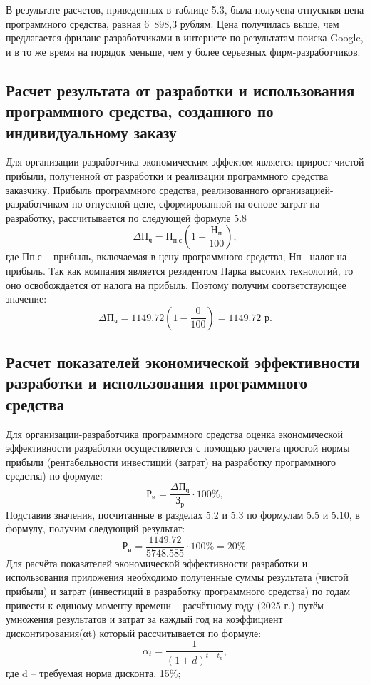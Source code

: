 В результате расчетов, приведенных в таблице 5.3, была получена отпускная цена программного средства, равная 6 898,3 рублям. Цена получилась выше, чем предлагается фриланс-разработчиками в интернете по результатам поиска Google, и в то же время на порядок меньше, чем у более серьезных фирм-разработчиков. 


\subsection{Расчет результата от разработки и использования программного средства, созданного по индивидуальному заказу} 


Для организации-разработчика экономическим эффектом является прирост чистой прибыли, полученной от разработки и реализации программного средства заказчику.
Прибыль программного средства, реализованного организацией-разработчиком по отпускной цене, сформированной на основе затрат на разработку, рассчитывается по следующей формуле 5.8
\begin{equation}
	\Delta 	\mathrm{П_{ч}} = \mathrm{П_{п.с}} \left( 1 - \frac{	\mathrm{Н_{п}}}{100} \right),
\end{equation}
где Пп.с – прибыль, включаемая в цену программного средства, Нп –налог на прибыль. Так как компания является резидентом Парка высоких технологий, то оно освобождается от налога на прибыль. Поэтому получим соответствующее значение:
\[
\Delta \mathrm{П_{ч}} = 1149.72 \left(1 - \frac{0}{100}\right) = 1149.72 \text{ р}.
\]

\subsection{Расчет показателей экономической эффективности разработки и использования программного средства} 

Для организации-разработчика программного средства оценка экономической эффективности разработки осуществляется с помощью расчета простой нормы прибыли (рентабельности инвестиций (затрат) на разработку программного средства) по формуле:
\begin{equation}
		\mathrm{Р_{и}} = \frac{\Delta 	\mathrm{П_{ч}}}{\mathrm{З_{р}}} \cdot 100\%,
\end{equation}
Подставив значения, посчитанные в разделах 5.2 и 5.3 по формулам 5.5 и 5.10, в формулу, получим следующий результат:
\[
\mathrm{Р_{и}} = \frac{1149.72}{5748.585} \cdot 100\% = 20\%.
\]
Для расчёта показателей экономической эффективности разработки и использования приложения необходимо полученные суммы результата (чистой прибыли) и затрат (инвестиций в разработку программного средства) по годам привести к единому моменту времени – расчётному году (2025 г.) путём умножения результатов и затрат за каждый год на коэффициент дисконтирования(αt) который рассчитывается по формуле:
\begin{equation}
	\alpha_t = \frac{1}{(1 + d)^{t - t_p}},
\end{equation}
где d – требуемая норма дисконта, 15\%;
 
